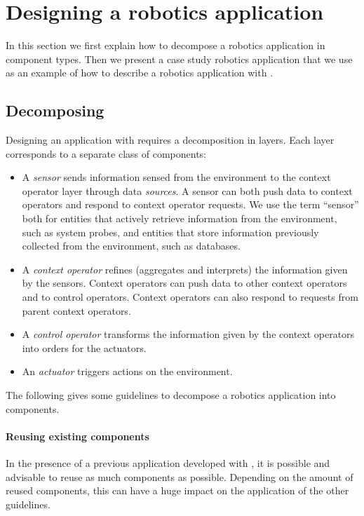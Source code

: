 \section{Designing a robotics application}
\label{sec:designing}

In this section we first explain how to decompose a robotics
application in \diaspec{} component types. Then we present a case
study robotics application that we use as an example of how to
describe a robotics application with \diaspec{}.

\subsection{Decomposing}

Designing an application with \diaspec{} requires a decomposition in
layers. Each layer corresponds to a separate class of components:

\begin{itemize}
\item A \emph{sensor} sends information sensed from the environment to
  the context operator layer through data \emph{sources}. A sensor can
  both push data to context operators and respond to context operator
  requests. We use the term ``sensor'' both for entities that actively
  retrieve information from the environment, such as system probes,
  and entities that store information previously collected from the
  environment, such as databases.
\item A \emph{context operator} refines (aggregates and interprets)
  the information given by the sensors. Context operators can push
  data to other context operators and to control operators. Context
  operators can also respond to requests from parent context
  operators.
\item A \emph{control operator} transforms the information given by
  the context operators into orders for the actuators.
\item An \emph{actuator} triggers actions on the environment.
\end{itemize}

The following gives some guidelines to decompose a robotics
application into components.

\paragraph{Reusing existing components}
In the presence of a previous application developed with \diaspec{},
it is possible and advisable to reuse as much components as possible.
Depending on the amount of reused components, this can have a huge
impact on the application of the other guidelines.

